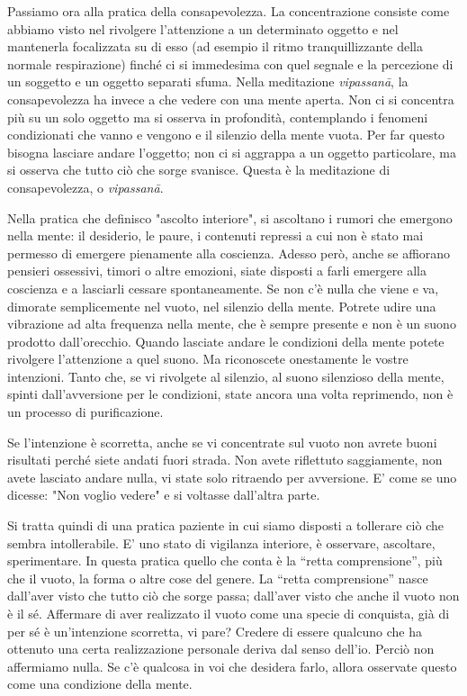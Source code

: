 
Passiamo ora alla pratica della consapevolezza. La concentrazione
consiste come abbiamo visto nel rivolgere l'attenzione a un determinato
oggetto e nel mantenerla focalizzata su di esso (ad esempio il ritmo
tranquillizzante della normale respirazione) finché ci si immedesima con
quel segnale e la percezione di un soggetto e un oggetto separati sfuma.
Nella meditazione \textit{vipassanā}, la consapevolezza ha invece a che vedere
con una mente aperta. Non ci si concentra più su un solo oggetto ma si
osserva in profondità, contemplando i fenomeni condizionati che vanno e
vengono e il silenzio della mente vuota. Per far questo bisogna lasciare
andare l'oggetto; non ci si aggrappa a un oggetto particolare, ma si
osserva che tutto ciò che sorge svanisce. Questa è la meditazione di
consapevolezza, o \textit{vipassanā}.

Nella pratica che definisco "ascolto interiore", si ascoltano i rumori
che emergono nella mente: il desiderio, le paure, i contenuti repressi a
cui non è stato mai permesso di emergere pienamente alla coscienza.
Adesso però, anche se affiorano pensieri ossessivi, timori o altre
emozioni, siate disposti a farli emergere alla coscienza e a lasciarli
cessare spontaneamente. Se non c'è nulla che viene e va, dimorate
semplicemente nel vuoto, nel silenzio della mente. Potrete udire una
vibrazione ad alta frequenza nella mente, che è sempre presente e non è
un suono prodotto dall'orecchio. Quando lasciate andare le condizioni
della mente potete rivolgere l'attenzione a quel suono. Ma riconoscete
onestamente le vostre intenzioni. Tanto che, se vi rivolgete al
silenzio, al suono silenzioso della mente, spinti dall'avversione per le
condizioni, state ancora una volta reprimendo, non è un processo di
purificazione.

Se l'intenzione è scorretta, anche se vi concentrate sul vuoto non
avrete buoni risultati perché siete andati fuori strada. Non avete
riflettuto saggiamente, non avete lasciato andare nulla, vi state solo
ritraendo per avversione. E' come se uno dicesse: "Non voglio vedere" e
si voltasse dall'altra parte.

Si tratta quindi di una pratica paziente in cui siamo disposti a
tollerare ciò che sembra intollerabile. E' uno stato di vigilanza
interiore, è osservare, ascoltare, sperimentare. In questa pratica
quello che conta è la “retta comprensione”, più che il vuoto, la forma o
altre cose del genere. La “retta comprensione” nasce dall'aver visto che
tutto ciò che sorge passa; dall'aver visto che anche il vuoto non è il
sé. Affermare di aver realizzato il vuoto come una specie di conquista,
già di per sé è un'intenzione scorretta, vi pare? Credere di essere
qualcuno che ha ottenuto una certa realizzazione personale deriva dal
senso dell'io. Perciò non affermiamo nulla. Se c'è qualcosa in voi che
desidera farlo, allora osservate questo come una condizione della mente.

